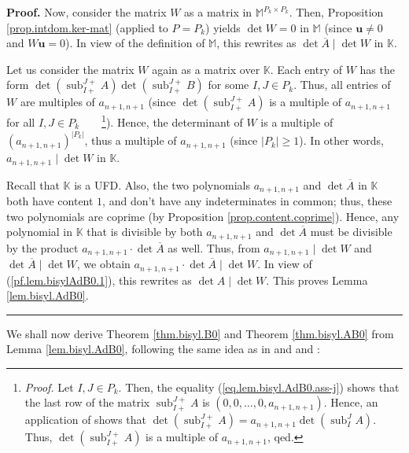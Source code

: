 \documentclass[numbers=enddot,12pt,final,onecolumn,notitlepage]{scrartcl}%
\theoremstyle{definition}
\newenvironment{proof}[1][Proof]{\noindent\textbf{#1.} }{\ \rule{0.5em}{0.5em}}
\begin{document}
\begin{proof}
Now, consider the matrix $W$ as a matrix in $\mathbb{M}^{P_{k}\times P_{k}}$.
Then, Proposition \ref{prop.intdom.ker-mat} (applied to $P=P_{k}$) yields
$\det W=0$ in $\mathbb{M}$ (since $\mathbf{u}\neq0$ and $W\mathbf{u}=0$). In
view of the definition of $\mathbb{M}$, this rewrites as $\det\overline{A}%
\mid\det W$ in $\mathbb{K}$.

Let us consider the matrix $W$ again as a matrix over $\mathbb{K}$. Each entry
of $W$ has the form $\det\left(  \operatorname*{sub}\nolimits_{I+}%
^{J+}A\right)  \det\left(  \operatorname*{sub}\nolimits_{I+}^{J+}B\right)  $
for some $I,J\in P_{k}$. Thus, all entries of $W$ are multiples of
$a_{n+1,n+1}$ (since $\det\left(  \operatorname*{sub}\nolimits_{I+}%
^{J+}A\right)  $ is a multiple of $a_{n+1,n+1}$ for all $I,J\in P_{k}%
$\ \ \ \ \footnote{\textit{Proof.} Let $I,J\in P_{k}$. Then, the equality
(\ref{eq.lem.bisyl.AdB0.ass-j}) shows that the last row of the matrix
$\operatorname*{sub}\nolimits_{I+}^{J+}A$ is $\left(  0,0,\ldots
,0,a_{n+1,n+1}\right)  $. Hence, an application of \cite[Theorem
6.43]{detnotes} shows that $\det\left(  \operatorname*{sub}\nolimits_{I+}%
^{J+}A\right)  =a_{n+1,n+1}\det\left(  \operatorname*{sub}\nolimits_{I}%
^{J}A\right)  $. Thus, $\det\left(  \operatorname*{sub}\nolimits_{I+}%
^{J+}A\right)  $ is a multiple of $a_{n+1,n+1}$, qed.}). Hence, the
determinant of $W$ is a multiple of $\left(  a_{n+1,n+1}\right)  ^{\left\vert
P_{k}\right\vert }$, thus a multiple of $a_{n+1,n+1}$ (since $\left\vert
P_{k}\right\vert \geq1$). In other words, $a_{n+1,n+1}\mid\det W$ in
$\mathbb{K}$.

Recall that $\mathbb{K}$ is a UFD. Also, the two polynomials $a_{n+1,n+1}$ and
$\det\overline{A}$ in $\mathbb{K}$ both have content $1$, and don't have any
indeterminates in common; thus, these two polynomials are coprime (by
Proposition \ref{prop.content.coprime}). Hence, any polynomial in $\mathbb{K}$
that is divisible by both $a_{n+1,n+1}$ and $\det\overline{A}$ must be
divisible by the product $a_{n+1,n+1}\cdot\det\overline{A}$ as well. Thus,
from $a_{n+1,n+1}\mid\det W$ and $\det\overline{A}\mid\det W$, we obtain
$a_{n+1,n+1}\cdot\det\overline{A}\mid\det W$. In view of
(\ref{pf.lem.bisylAdB0.1}), this rewrites as $\det A\mid\det W$. This proves
Lemma \ref{lem.bisyl.AdB0}.
\end{proof}

We shall now derive Theorem \ref{thm.bisyl.B0} and Theorem \ref{thm.bisyl.AB0}
from Lemma \ref{lem.bisyl.AdB0}, following the same idea as in \cite[\S 2.7]%
{Prasolov} and \cite[Teorema 2.9.1]{Prasol15} and \cite{Mohr53}:
\end{document}
